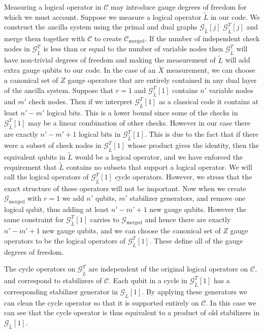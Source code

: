 \documentclass[reprint,
superscriptaddress,
 amsmath,amssymb,
 aps, longbibliography
]{revtex4-1}
\newcommand{\rev}[1]{{#1}}
\begin{document}
Measuring a logical operator in $\mathcal{C}$ may introduce \rev{gauge} degrees of freedom for which we must account. Suppose we measure a logical operator $\tilde{L}$ in our code. We construct the ancilla system using the primal and dual graphs $\mathcal{G}_{\tilde{L}}[j]$ $\mathcal{G}^T_{\tilde{L}}[j]$ and merge them together with $\mathcal{C}$ to create $\mathcal{C}_{\text{merged}}$. If the number of independent check nodes in $\mathcal{G}^T_{\tilde{L}}$ is less than or equal to the number of variable nodes then $\mathcal{G}^T_{\tilde{L}}$ will have non-trivial degrees of freedom and making the measurement of $\tilde{L}$ will add extra \rev{gauge} \rev{qubits} to our code. \rev{In the case of an $\tilde{X}$ measurement, we can choose a canonical set of $Z$ gauge operators that are entirely contained in any dual layer of the ancilla system. Suppose that $r=1$ and $\mathcal{G}^T_{\tilde{L}}[1]$ contains $n'$ variable nodes and $m'$ check nodes. Then if we interpret $\mathcal{G}^T_{\tilde{L}}[1]$ as a classical code it contains at least $n'-m'$ logical bits. This is a lower bound since some of the checks in $\mathcal{G}^T_{\tilde{L}}[1]$ may be a linear combination of other checks. However in our case there are exactly $n'-m'+1$ logical bits in $\mathcal{G}^T_{\tilde{L}}[1]$. This is due to the fact that if there were a subset of check nodes in $\mathcal{G}^T_{\tilde{L}}[1]$ whose product gives the identity, then the equivalent qubits in $\tilde{L}$ would be a logical operator, and we have enforced the requirement that $\tilde{L}$ contains no subsets that support a logical operator. We will call the logical operators of $\mathcal{G}^T_{\tilde{L}}[1]$ cycle operators. However, we stress that the exact structure of these operators will not be important. Now when we create $\mathcal{G}_{\text{merged}}$ with $r=1$ we add $n'$ qubits, $m'$ stabilizer generators, and remove one logical qubit, thus adding at least $n'-m'+1$ new gauge qubits. However the same constraint for $\mathcal{G}^T_{\tilde{L}}[1]$ carries to $\mathcal{G}_{\text{merged}}$ and hence there are exactly $n'-m'+1$ new gauge qubits, and we can choose the canonical set of $Z$ gauge operators to be the logical operators of $\mathcal{G}^T_{\tilde{L}}[1]$.} These define all of the \rev{gauge} degrees of freedom.

The \rev{cycle operators} on $\mathcal{G}^T_{\tilde{L}}$ are independent of the original logical operators on $\mathcal{C}$, and correspond to stabilizers of $\mathcal{C}$. Each qubit in a cycle in $\mathcal{G}^T_{\tilde{L}}[1]$ has a corresponding stabilizer generator in $\mathcal{G}_{\tilde{L}}[1]$. By applying these generators we can \rev{clean} the \rev{cycle operator} so that it is supported entirely on $\mathcal{C}$. In this case we can see that the \rev{cycle operator} is thus equivalent to a product of old stabilizers in $\mathcal{G}_{\tilde{L}}[1]$. %
\end{document}
